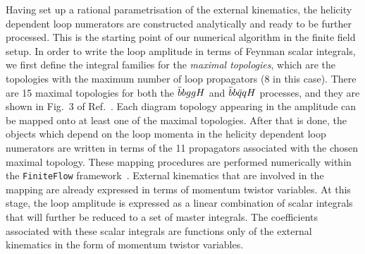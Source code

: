 \documentclass[main.tex]{subfiles}
\begin{document}
Having set up a rational parametrisation of the external kinematics, the helicity dependent loop numerators are constructed analytically and
ready to be further processed.
This is the starting point of our numerical algorithm in the finite field setup. 
In order to write the loop amplitude in terms of Feynman scalar integrals, 
we first define the integral families for the \textit{maximal topologies}, 
which are the topologies with the maximum number of loop propagators (8 in this case). 
There are 15 maximal topologies for both the $\bar{b}bggH$ and $\bar{b}b\bar{q}qH$ processes, and they are shown in Fig.~3 of Ref.~\cite{Badger:2021nhg}. 
Each diagram topology appearing in the amplitude can be mapped onto at least one of the maximal topologies. 
After that is done, the objects which depend on the loop momenta in the helicity dependent loop numerators are written in terms of 
the 11 propagators associated with the chosen maximal topology. 
These mapping procedures are performed numerically within the \texttt{FiniteFlow} framework~\cite{Peraro:2019svx}. 
External kinematics that are involved in the mapping are already expressed in terms of momentum twistor variables.
At this stage, the loop amplitude is expressed as a linear combination of scalar integrals that will further be 
reduced to a set of master integrals. The coefficients associated with these scalar integrals are functions only of the external kinematics in the
form of momentum twistor variables.
\end{document}
